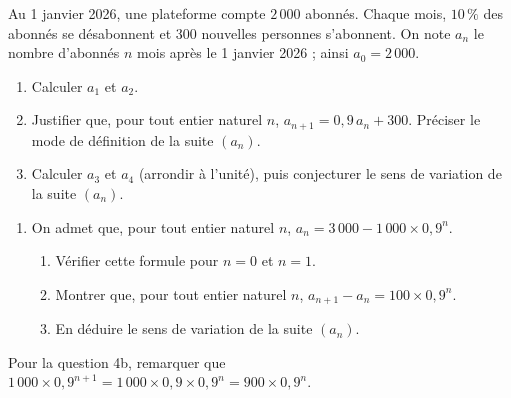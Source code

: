 \documentclass[10pt,a4paper]{article}
\begin{document}
\begin{exo}
Au 1\ier{} janvier 2026, une plateforme compte \(2\,000\) abonnés. Chaque mois, \(10\,\%\) des abonnés se désabonnent et \(300\) nouvelles personnes s'abonnent. On note \(a_n\) le nombre d'abonnés \(n\) mois après le 1\ier{} janvier 2026 ; ainsi \(a_0=2\,000\).
\begin{enumerate}[leftmargin=*]
    \item Calculer \(a_1\) et \(a_2\).
    \item Justifier que, pour tout entier naturel \(n\), \(a_{n+1}=0,9\,a_n+300\). Préciser le mode de définition de la suite \((a_n)\).
    \item Calculer \(a_3\) et \(a_4\) (arrondir à l'unité), puis conjecturer le sens de variation de la suite \((a_n)\).
\end{enumerate}
\begin{bloc}
\begin{enumerate}[leftmargin=*, start=4]
    \item On admet que, pour tout entier naturel \(n\), \(a_n=3\,000-1\,000\times 0,9^n\).
    \begin{enumerate}
        \item Vérifier cette formule pour \(n=0\) et \(n=1\).
        \item Montrer que, pour tout entier naturel \(n\), \(a_{n+1}-a_n=100\times 0,9^n\).
        \item En déduire le sens de variation de la suite \((a_n)\).
    \end{enumerate}
\end{enumerate}

\begin{indication}
Pour la question 4b, remarquer que \(1\,000\times 0,9^{n+1}=1\,000\times 0,9\times 0,9^n=900\times 0,9^n\).
\end{indication}
\end{bloc}
\end{exo}
\end{document}
